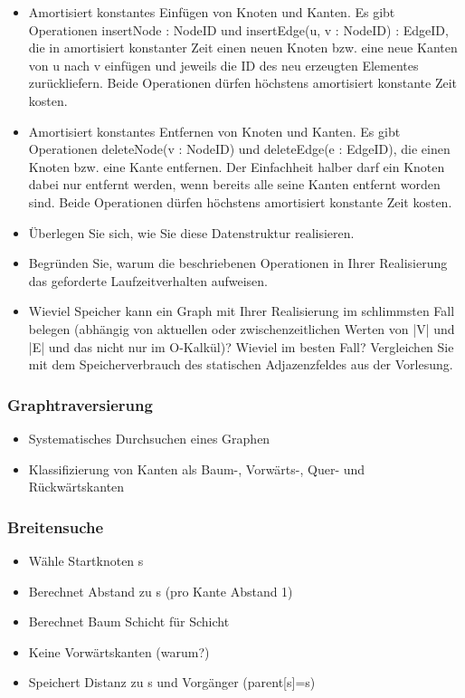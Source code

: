 \begin{frame}
\begin{itemize}
\item Amortisiert konstantes Einfügen von Knoten und Kanten. Es gibt Operationen
 insertNode : NodeID und
 insertEdge(u, v : NodeID) : EdgeID,
die in amortisiert konstanter Zeit einen neuen Knoten bzw. eine neue Kanten von u nach v
einfügen und jeweils die ID des neu erzeugten Elementes zurückliefern. Beide Operationen
dürfen höchstens amortisiert konstante Zeit kosten.
\item Amortisiert konstantes Entfernen von Knoten und Kanten. Es gibt Operationen
 deleteNode(v : NodeID) und
 deleteEdge(e : EdgeID),
die einen Knoten bzw. eine Kante entfernen. Der Einfachheit halber darf ein Knoten dabei
nur entfernt werden, wenn bereits alle seine Kanten entfernt worden sind. Beide Operationen
dürfen höchstens amortisiert konstante Zeit kosten.
\end{itemize}
\end{frame}

\begin{frame}
\begin{itemize}
\item Überlegen Sie sich, wie Sie diese Datenstruktur realisieren.
\item Begründen Sie, warum die beschriebenen Operationen in Ihrer Realisierung das geforderte
Laufzeitverhalten aufweisen.
\item Wieviel Speicher kann ein Graph mit Ihrer Realisierung im schlimmsten Fall belegen
(abhängig von aktuellen oder zwischenzeitlichen Werten von |V| und |E| und das nicht
nur im O-Kalkül)? Wieviel im besten Fall? Vergleichen Sie mit dem Speicherverbrauch
des statischen Adjazenzfeldes aus der Vorlesung.
\end{itemize}
\end{frame}

\begin{frame}
\frametitle{Graphtraversierung}
\begin{itemize}
\item Systematisches Durchsuchen eines Graphen\pause
\item Klassifizierung von Kanten als Baum-, Vorwärts-, Quer- und Rückwärtskanten
\end{itemize}
\end{frame}

\begin{frame}
\frametitle{Breitensuche}
\begin{itemize}
\item Wähle Startknoten s
\item Berechnet Abstand zu s (pro Kante Abstand 1)\pause
\item Berechnet Baum Schicht für Schicht\pause
\item Keine Vorwärtskanten (warum?)\pause
\item Speichert Distanz zu s und Vorgänger (parent[s]=s)
\end{itemize}
\end{frame}

